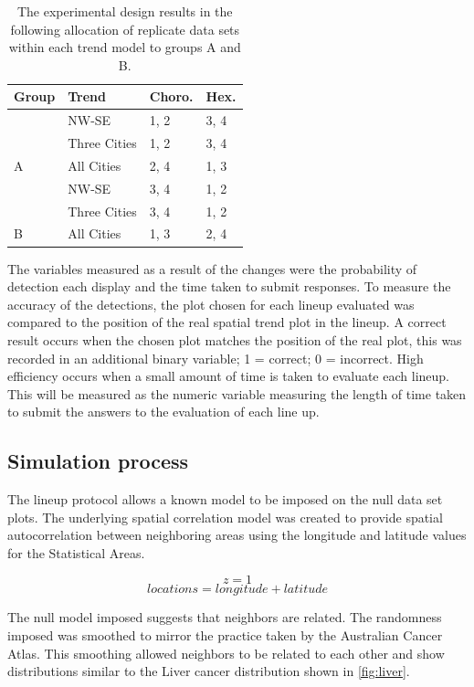 \documentclass[conference,final,]{IEEEtran}
\begin{document}
\begin{table}

\caption{\label{tab:exp-design}The experimental design results in the following allocation of replicate data sets within each trend model to groups A and B.}
\centering
\begin{tabular}[t]{llll}
\toprule
Group & Trend & Choro. & Hex.\\
\midrule
 & NW-SE & 1, 2 & 3, 4\\
\cmidrule{2-4}
 & Three Cities & 1, 2 & 3, 4\\
\cmidrule{2-4}
\multirow{-3}{*}{\raggedright\arraybackslash A} & All Cities & 2, 4 & 1, 3\\
\cmidrule{1-4}
 & NW-SE & 3, 4 & 1, 2\\
\cmidrule{2-4}
 & Three Cities & 3, 4 & 1, 2\\
\cmidrule{2-4}
\multirow{-3}{*}{\raggedright\arraybackslash B} & All Cities & 1, 3 & 2, 4\\
\bottomrule
\end{tabular}
\end{table}

The variables measured as a result of the changes were the probability of detection each display and the time taken to submit responses.
To measure the accuracy of the detections, the plot chosen for each lineup evaluated was compared to the position of the real spatial trend plot in the lineup. A correct result occurs when the chosen plot matches the position of the real plot, this was recorded in an additional binary variable; 1 = correct; 0 = incorrect.
High efficiency occurs when a small amount of time is taken to evaluate each lineup. This will be measured as the numeric variable measuring the length of time taken to submit the answers to the evaluation of each line up.

\hypertarget{simulation-process}{%
\subsection{Simulation process}\label{simulation-process}}

The lineup protocol allows a known model to be imposed on the null data set plots.
The underlying spatial correlation model was created to provide spatial autocorrelation between neighboring areas using the longitude and latitude values for the Statistical Areas.

\[z = 1\]
\[locations = longitude + latitude\]

The null model imposed suggests that neighbors are related. The randomness imposed was smoothed to mirror the practice taken by the Australian Cancer Atlas. This smoothing allowed neighbors to be related to each other and show distributions similar to the Liver cancer distribution shown in \ref{fig:liver}.
\end{document}

